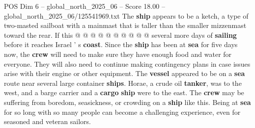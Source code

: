 \begin{textsample}{POS Dim 6 – global\_north\_2025\_06 – Score 18.00 – global\_north\_2025\_06/125541969.txt}
The \textbf{ship} appears to be a ketch, a type of two-masted sailboat with a mainmast that is taller than the smaller mizzenmast toward the rear.
If this @ @ @ @ @ @ @ @ @ @ several more days of \textbf{sailing} before it reaches Israel ' s \textbf{coast}.
Since the \textbf{ship} has been at \textbf{sea} for five days now, the \textbf{crew} will need to make sure they have enough food and water for everyone.
They will also need to continue making contingency plans in case issues arise with their engine or other equipment.
The \textbf{vessel} appeared to be on a \textbf{sea} route near several large container \textbf{ships}.
Horae, a crude oil \textbf{tanker}, was to the west, and a barge carrier and a \textbf{cargo} \textbf{ship} were to the east.
The \textbf{crew} may be suffering from boredom, seasickness, or crowding on a \textbf{ship} like this.
Being at \textbf{sea} for so long with so many people can become a challenging experience, even for seasoned and veteran sailors.

\end{textsample}
